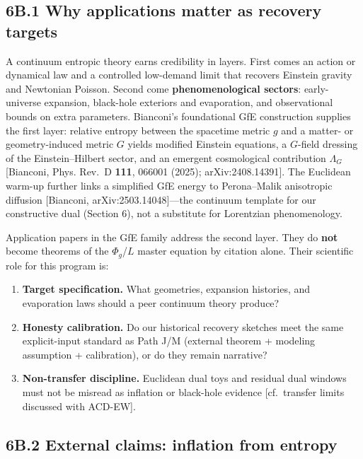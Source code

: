 \documentclass[
  11pt,
]{article}
\providecommand{\tightlist}{%
  \setlength{\itemsep}{0pt}\setlength{\parskip}{0pt}}
\begin{document}
\subsection{6B.1 Why applications matter as recovery targets}\label{b.1-why-applications-matter-as-recovery-targets}

A continuum entropic theory earns credibility in layers. First comes an action or dynamical law and a controlled low-demand limit that recovers Einstein gravity and Newtonian Poisson. Second come \textbf{phenomenological sectors}: early-universe expansion, black-hole exteriors and evaporation, and observational bounds on extra parameters. Bianconi's foundational GfE construction supplies the first layer: relative entropy between the spacetime metric \(g\) and a matter- or geometry-induced metric \(G\) yields modified Einstein equations, a \(G\)-field dressing of the Einstein--Hilbert sector, and an emergent cosmological contribution \(\Lambda_G\) {[}Bianconi, Phys. Rev.~D \textbf{111}, 066001 (2025); arXiv:2408.14391{]}. The Euclidean warm-up further links a simplified GfE energy to Perona--Malik anisotropic diffusion {[}Bianconi, arXiv:2503.14048{]}---the continuum template for our constructive dual (Section 6), not a substitute for Lorentzian phenomenology.

Application papers in the GfE family address the second layer. They do \textbf{not} become theorems of the \(\Phi_g\)/\(L\) master equation by citation alone. Their scientific role for this program is:

\begin{enumerate}
\def\labelenumi{\arabic{enumi}.}
\tightlist
\item
  \textbf{Target specification.} What geometries, expansion histories, and evaporation laws should a peer continuum theory produce?
\item
  \textbf{Honesty calibration.} Do our historical recovery sketches meet the same explicit-input standard as Path J/M (external theorem + modeling assumption + calibration), or do they remain narrative?
\item
  \textbf{Non-transfer discipline.} Euclidean dual toys and residual dual windows must not be misread as inflation or black-hole evidence {[}cf.~transfer limits discussed with ACD-EW{]}.
\end{enumerate}

\subsection{6B.2 External claims: inflation from entropy}\label{b.2-external-claims-inflation-from-entropy}
\end{document}
